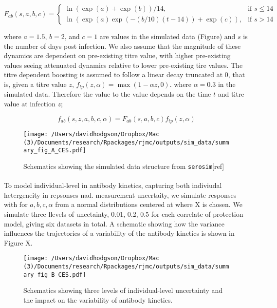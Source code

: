 \documentclass{article}
\begin{document}
\begin{equation}
\label{eq_ab}
F_{ab}(s, a, b, c) =
\begin{cases}
  \ln(\exp(a) + \exp(b)) / 14, & \text{if }s \leq 14 \\
  \ln(\exp(a) \exp(-(b/10)(t - 14)) + \exp(c)), &\text{if } s > 14
\end{cases}
\end{equation}

where $a = 1.5$, $b = 2$, and $c = 1$ are values in the simulated data (Figure) and $s$ is the number of days post infection. We also assume that the magnitude of these dynamics are dependent on pre-existing titre value, with higher pre-existing values seeing attenuated dynamics relative to lower pre-existing tire values. The titre dependent boosting is assumed to follow a linear decay truncated at 0, that is, given a titre value $z$, $f_{tp}(z, \alpha) = \max(1 - \alpha z, 0)$. where $\alpha = 0.3 $ in the simulated data.  Therefore the value to the value depends on the time $t$ and titre value at infection $z$;  

\begin{equation}
\label{eq_ab2}
f_{ab}(s, z, a, b, c, \alpha) = F_{ab}(s, a, b, c)f_{tp}(z, \alpha) 
\end{equation}

\begin{figure}[ht]
    \centering
    \texttt{[image: /Users/davidhodgson/Dropbox/Mac (3)/Documents/research/Rpackages/rjmc/outputs/sim\_data/summary\_fig\_A\_CES.pdf]}     \caption{Schematics showing the simulated data structure from \texttt{serosim}[ref]}
    \label{fig:sim_A}
\end{figure}



\paragraph{}To model individual-level in antibody kinetics, capturing both indiviudal hetergeneity in repsonses nad. measurement uncertaity, we simulate responses with for $a, b, c, \alpha$ from a normal distributions centered at where X is chosen. We simulate three  llevels of uncetainty, 0.01, 0.2, 0.5 for each correlate of protection model, giving six datasets in total. A schematic showing how the variance influences the trajectories of a variability of the antibody kinetics is shown in Figure X. 

\begin{figure}[ht]
    \centering
    \texttt{[image: /Users/davidhodgson/Dropbox/Mac (3)/Documents/research/Rpackages/rjmc/outputs/sim\_data/summary\_fig\_B\_CES.pdf]}     \caption{Schematics showing three levels of individual-level uncertainty and the impact on the  variability of antibody kinetics.   }
    \label{fig:sim_B}
\end{figure}
\end{document}

